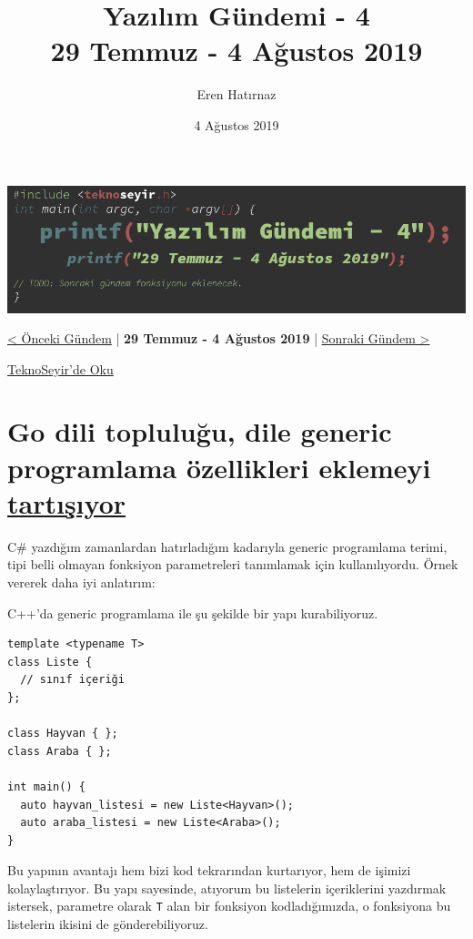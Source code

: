 \documentclass[11pt]{article}
\author{Eren Hatırnaz}
\date{4 Ağustos 2019}
\title{Yazılım Gündemi - 4\\\medskip
\large 29 Temmuz - 4 Ağustos 2019}
\begin{document}
\maketitle
\tableofcontents \clearpage\shorthandoff{=}

\begin{center}
\includegraphics[width=.9\linewidth]{gorseller/yazilim-gundemi-banner.png}
\end{center}
\begin{center}
\href{../03/yazilim-gundemi-03.pdf}{< Önceki Gündem} | \textbf{29 Temmuz - 4 Ağustos 2019} | \href{../05/yazilim-gundemi-05.pdf}{Sonraki Gündem >}

\href{https://teknoseyir.com/blog/yazilim-gundemi-4-29-temmuz-4-agustos-2019}{TeknoSeyir'de Oku}
\end{center}

\section{Go dili topluluğu, dile generic programlama özellikleri eklemeyi \href{https://github.com/golang/go/issues/15292}{tartışıyor}}
\label{sec:org21c0b8a}
C\# yazdığım zamanlardan hatırladığım kadarıyla generic programlama terimi,
tipi belli olmayan fonksiyon parametreleri tanımlamak için kullanılıyordu.
Örnek vererek daha iyi anlatırım:

C++'da generic programlama ile şu şekilde bir yapı kurabiliyoruz.

\begin{verbatim}
template <typename T>
class Liste {
  // sınıf içeriği
};

class Hayvan { };
class Araba { };

int main() {
  auto hayvan_listesi = new Liste<Hayvan>();
  auto araba_listesi = new Liste<Araba>();
}
\end{verbatim}

Bu yapının avantajı hem bizi kod tekrarından kurtarıyor, hem de işimizi
kolaylaştırıyor. Bu yapı sayesinde, atıyorum bu listelerin içeriklerini
yazdırmak istersek, parametre olarak \texttt{T} alan bir fonksiyon kodladığımızda, o
fonksiyona bu listelerin ikisini de gönderebiliyoruz.
\end{document}
